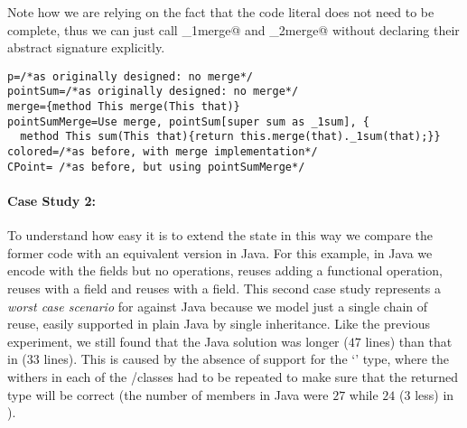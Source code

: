Note how we are relying on the fact that the code literal
 does not need to be complete, 
thus we can just call \Q@_1merge@ and \Q@_2merge@ without
 declaring their abstract signature explicitly.


\saveSpace\saveSpace \begin{lstlisting}
p=/*as originally designed: no merge*/
pointSum=/*as originally designed: no merge*/
merge={method This merge(This that)}
pointSumMerge=Use merge, pointSum[super sum as _1sum], { 
  method This sum(This that){return this.merge(that)._1sum(that);}}
colored=/*as before, with merge implementation*/
CPoint= /*as before, but using pointSumMerge*/
\end{lstlisting} \saveSpace\saveSpace 



\paragraph{Case Study 2:}
To understand how easy it is to extend the state in this
way we compare the former code with an equivalent version in
Java.
For this example, in Java we encode \Q@Point@ with the fields but no operations,
\Q@PointSum@ reuses \Q@Point@ adding a functional \Q@sum@ operation,
\Q@CPoint@ reuses \Q@PointSum@ with a \Q@Color@ field
and \Q@FCPoint@ reuses \Q@CPoint@ with a \Q@Flavour@ field.
This second case study represents a \emph{worst case scenario} for \name against Java because we model just a single chain of reuse,
easily supported in plain Java by single inheritance.
Like the previous experiment, we still found that the Java solution was longer ($47$ lines) than that
in \name ($33$ lines). This is caused by the absence of support for the `\Q@This@' type,
where the withers in each of the \Q@CPoint@/\Q@FCpoint@ classes had to be repeated
to make sure that the returned type will be correct (the number of members in Java were $27$ while $24$ ($3$ less)
in \name).

